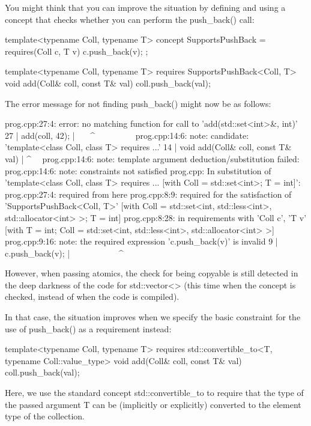 You might think that you can improve the situation by defining and using a concept that checks whether you can perform the push\_back() call:

\begin{cpp}
template<typename Coll, typename T>
concept SupportsPushBack = requires(Coll c, T v) {
	c.push_back(v);
};

template<typename Coll, typename T>
requires SupportsPushBack<Coll, T>
void add(Coll& coll, const T& val)
{
	coll.push_back(val);
}
\end{cpp}

The error message for not finding push\_back() might now be as follows:

{\scriptsize
\begin{shell}
prog.cpp:27:4: error: no matching function for call to ’add(std::set<int>&, int)’
    27 | add(coll, 42);
        | ~~~^~~~~~~~~~
prog.cpp:14:6: note: candidate: ’template<class Coll, class T> requires ...’
     14 | void add(Coll& coll, const T& val)
         |      ^~~
prog.cpp:14:6: note: template argument deduction/substitution failed:
prog.cpp:14:6: note: constraints not satisfied
prog.cpp: In substitution of ’template<class Coll, class T> requires ...
           [with Coll = std::set<int>; T = int]’:
prog.cpp:27:4: required from here
prog.cpp:8:9: required for the satisfaction of ’SupportsPushBack<Coll, T>’
                  [with Coll = std::set<int, std::less<int>, std::allocator<int> >; T = int]
prog.cpp:8:28: in requirements with ’Coll c’, ’T v’
                      [with T = int; Coll = std::set<int, std::less<int>, std::allocator<int> >]
prog.cpp:9:16: note: the required expression ’c.push_back(v)’ is invalid
      9 | c.push_back(v);
         | ~~~~~~~~~~~^~~
\end{shell}
}

However, when passing atomics, the check for being copyable is still detected in the deep darkness of the code for std::vector<> (this time when the concept is checked, instead of when the code is compiled).

In that case, the situation improves when we specify the basic constraint for the use of push\_back() as a requirement instead:

\begin{cpp}
template<typename Coll, typename T>
requires std::convertible_to<T, typename Coll::value_type>
void add(Coll& coll, const T& val)
{
	coll.push_back(val);
}
\end{cpp}

Here, we use the standard concept std::convertible\_to to require that the type of the passed argument T can be (implicitly or explicitly) converted to the element type of the collection.

